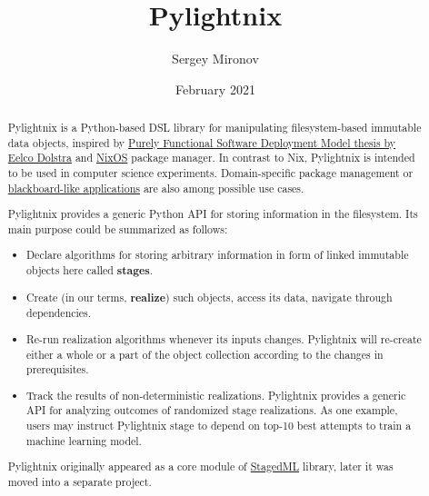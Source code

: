 \documentclass{article}
\begin{document}

\newenvironment{shellcode}
  {\VerbatimEnvironment\begin{verbatim}}
  {\end{verbatim}}
\newenvironment{pythoncode}
  {\VerbatimEnvironment\begin{verbatim}}
  {\end{verbatim}}


\title{Pylightnix}
\author{Sergey Mironov}
\date{February 2021}
\maketitle


\begin{abstract}

Pylightnix is a Python-based DSL library for manipulating filesystem-based
immutable data objects, inspired by
\href{https://edolstra.github.io/pubs/phd-thesis.pdf}{Purely Functional Software
Deployment Model thesis by Eelco Dolstra} and \href{https://nixos.org}{NixOS}
package manager. In contrast to Nix, Pylightnix is intended to be used in
computer science experiments. Domain-specific package management or
\href{https://en.wikipedia.org/wiki/Blackboard_design_pattern}{blackboard-like
applications} are also among possible use cases.

Pylightnix provides a generic Python API for storing information in the
filesystem. Its main purpose could be summarized as follows:
\begin{itemize}
  \item Declare algorithms for storing arbitrary information in form of linked
    immutable objects here called \textbf{stages}.
  \item Create (in our terms, \textbf{realize}) such objects, access its data,
    navigate through dependencies.
  \item Re-run realization algorithms whenever its inputs changes.  Pylightnix
    will re-create either a whole or a part of the object collection according
    to the changes in prerequisites.
  \item Track the results of non-deterministic realizations. Pylightnix provides
    a generic API for analyzing outcomes of randomized stage realizations. As
    one example, users may instruct Pylightnix stage to depend on top-10 best
    attempts to train a machine learning model.
\end{itemize}

Pylightnix originally appeared as a core module of
\href{https://github.com/stagedml/stagedml}{StagedML} library, later it was
moved into a separate project.

\end{abstract}
\end{document}
